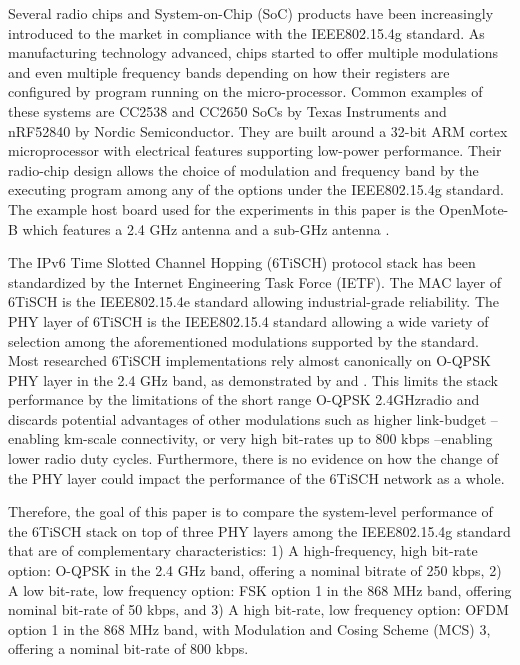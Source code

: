 \documentclass[journal]{IEEEtran}
\newcommand{\oqpsk}        {O-QPSK 2.4GHz}
\newcommand{\lorem}        {\textcolor{green}{Lorem ipsum dolor sit amet, consectetur adipiscing elit, sed do eiusmod tempor incididunt ut labore et dolore magna aliqua. Ut enim ad minim veniam, quis nostrud exercitation ullamco laboris nisi ut aliquip ex ea commodo consequat. Duis aute irure dolor in reprehenderit in voluptate velit esse cillum dolore eu fugiat nulla pariatur. Excepteur sint occaecat cupidatat non proident, sunt in culpa qui officia deserunt mollit anim id est laborum.}}
\begin{document}

Several radio chips and System-on-Chip (SoC) products have been increasingly introduced to the market in compliance with the IEEE802.15.4g standard. 
As manufacturing technology advanced, chips started to offer multiple modulations and even multiple frequency bands depending on how their registers are configured by program running on the micro-processor.
Common examples of these systems are CC2538 \cite{12cc2538} and CC2650 \cite{15cc2650} SoCs by Texas Instruments and nRF52840 \cite{19nrf52840} by Nordic Semiconductor. 
They are built around a 32-bit ARM cortex microprocessor with electrical features supporting low-power performance.
Their radio-chip design allows the choice of modulation and frequency band by the executing program among any of the options under the IEEE802.15.4g standard. 
The example host board used for the experiments in this paper is the OpenMote-B which features a 2.4 GHz antenna and a sub-GHz antenna \cite{tusetopenmote}.

The IPv6 Time Slotted Channel Hopping (6TiSCH) protocol stack has been  standardized by the Internet Engineering Task Force (IETF).
The MAC layer of 6TiSCH is the IEEE802.15.4e standard allowing industrial-grade reliability.
The PHY layer of 6TiSCH is the IEEE802.15.4 standard allowing a wide variety of selection among the aforementioned modulations supported by the standard.
Most researched 6TiSCH implementations rely almost canonically on O-QPSK PHY layer in the 2.4 GHz band, as demonstrated by \cite{j.munoz18problem} and \cite{brachmann19ieee}.
This limits the stack performance by the limitations of the short range \oqpsk  radio and discards potential advantages of other modulations such as higher link-budget --enabling km-scale connectivity, or very high bit-rates up to 800 kbps --enabling lower radio duty cycles.
Furthermore, there is no evidence on how the change of the PHY layer could impact the performance of the 6TiSCH network as a whole. 

Therefore, the goal of this paper is to compare the system-level performance of the 6TiSCH stack on top of three PHY layers among the IEEE802.15.4g standard that are of complementary characteristics: 
     1) A high-frequency, high bit-rate option: O-QPSK in the 2.4 GHz band, offering a nominal bitrate of 250 kbps,
     2) A low bit-rate, low frequency option: FSK option 1 in the 868 MHz band, offering nominal bit-rate of 50 kbps, and 
     3) A high bit-rate, low frequency option: OFDM option 1  in the 868 MHz band, with Modulation and Cosing Scheme (MCS) 3, offering a nominal bit-rate of 800 kbps. 
\end{document}
